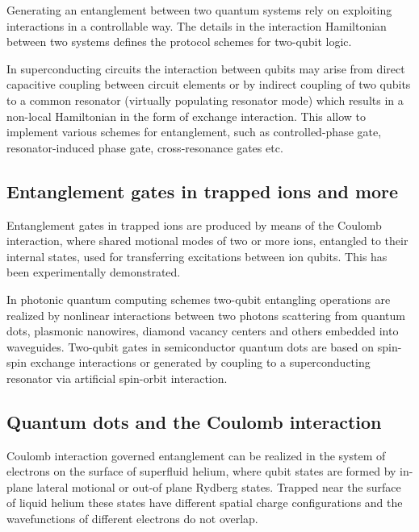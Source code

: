 \documentclass[%
oneside,                 %
final,                   %
10pt]{article}
\begin{document}
\begin{block}{}
Generating an entanglement between two quantum systems rely on
exploiting interactions in a controllable way. The details in the
interaction Hamiltonian between two systems defines the protocol
schemes for two-qubit logic.
\end{block}

\begin{block}{}
In  superconducting circuits the
interaction between qubits may arise from direct capacitive coupling
between circuit elements or by indirect coupling of two qubits to a
common resonator (virtually populating resonator mode) which results
in a non-local Hamiltonian in the form of exchange
interaction. This allow to implement various
schemes for entanglement, such as controlled-phase
gate, resonator-induced phase
gate, cross-resonance gates etc.
\end{block}

\subsection{Entanglement gates in trapped ions and more}

\begin{block}{}
Entanglement gates in trapped ions are
produced by means of the Coulomb interaction, where shared motional
modes of two or more ions, entangled to their internal states, used
for transferring excitations between ion
qubits. This has been experimentally
demonstrated.
\end{block}

\begin{block}{}
In photonic quantum
computing schemes two-qubit entangling operations are realized by
nonlinear interactions between two photons scattering from quantum
dots, plasmonic nanowires, diamond vacancy centers and others embedded
into waveguides. Two-qubit gates in
semiconductor quantum dots are based on spin-spin exchange
interactions or generated
by coupling to a superconducting resonator via artificial spin-orbit
interaction.
\end{block}

\subsection{Quantum dots and the Coulomb interaction}

\begin{block}{}
Coulomb interaction governed entanglement can be realized in
the system of electrons on the surface of superfluid helium, where
qubit states are formed by in-plane lateral motional or out-of plane
Rydberg states. Trapped near the surface of liquid helium these states
have different spatial charge configurations and the wavefunctions of
different electrons do not overlap.
\end{block}
\end{document}
